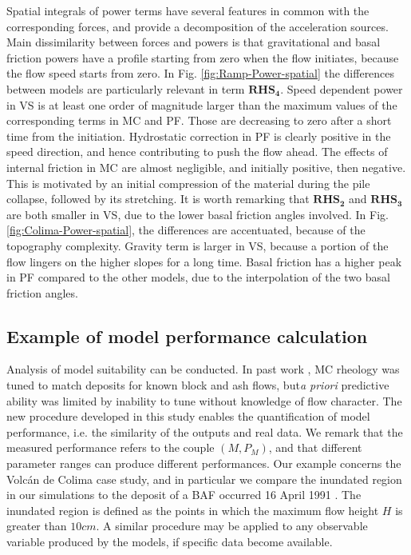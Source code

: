 \documentclass{article}
\begin{document}
Spatial integrals of power terms have several features in common with the corresponding forces, and provide a decomposition of the acceleration sources. Main dissimilarity between forces and powers is that gravitational and basal friction powers have a profile starting from zero when the flow initiates, because the flow speed starts from zero. In Fig. \ref{fig:Ramp-Power-spatial} the differences between models are particularly relevant in term  $\boldsymbol{RHS_4}$. Speed dependent power in VS is at least one order of magnitude larger than the maximum values of the corresponding terms in MC and PF. Those are decreasing to zero after a short time from the initiation. Hydrostatic correction in PF is clearly positive in the speed direction, and hence contributing to push the flow ahead. The effects of internal friction in MC are almost negligible, and initially positive, then negative. This is motivated by an initial compression of the material during the pile collapse, followed by its stretching. It is worth remarking that $\boldsymbol{RHS_2}$ and $\boldsymbol{RHS_3}$ are both smaller in VS, due to the lower basal friction angles involved. In Fig. \ref{fig:Colima-Power-spatial}, the differences are accentuated, because of the topography complexity. Gravity term is larger in VS, because a portion of the flow lingers on the higher slopes for a long time. Basal friction has a higher peak in PF compared to the other models, due to the interpolation of the two basal friction angles.

\subsection{Example of model performance calculation}
Analysis of model suitability can be conducted. In past work \cite{Patra2005}, MC rheology was tuned to match deposits for known block and ash flows, but{\it a priori} predictive ability was limited by inability to tune without knowledge of flow character. The new procedure developed in this study enables the quantification of model performance, i.e. the similarity of the outputs and real data. We remark that the measured performance refers to the couple $\left(M, P_M\right)$, and that different parameter ranges can produce different performances. Our example concerns the Volc{\'a}n de Colima case study, and in particular we compare the inundated region in our simulations to the deposit of a BAF occurred 16 April 1991 \citep{Saucedo2004, Rupp2004, Rupp2006}. The inundated region is defined as the points in which the maximum flow height $H$ is greater than $10 cm$. A similar procedure may be applied to any observable variable produced by the models, if specific data become available.
\end{document}
